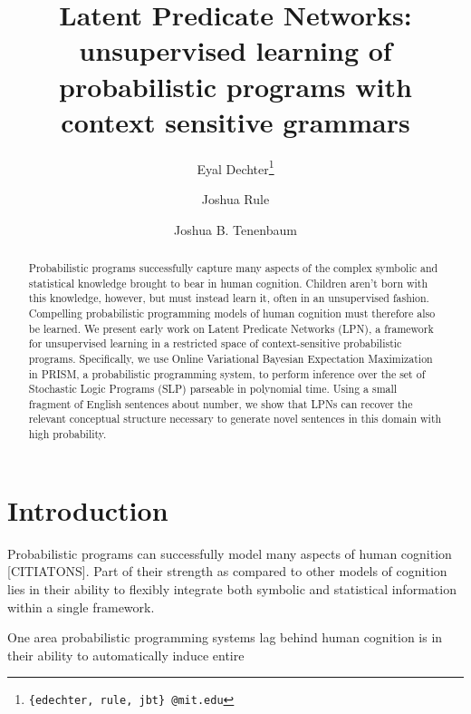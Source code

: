 \documentclass{article} %
\title{Latent Predicate Networks: unsupervised learning of  probabilistic programs with context sensitive grammars}
\author{Eyal Dechter\thanks{{\tt \{edechter, rule, jbt\} @mit.edu}}}
\author{Joshua Rule}
\author{Joshua B. Tenenbaum}
\affil{{\normalsize Department of Brain and Cognitive Sciences, MIT}}
\date{}
\begin{document}
\maketitle

\begin{abstract}

  Probabilistic programs successfully capture many aspects of the
  complex symbolic and statistical knowledge brought to bear in human
  cognition. Children aren't born with this knowledge, however, but
  must instead learn it, often in an unsupervised fashion. Compelling
  probabilistic programming models of human cognition must therefore
  also be learned. We present early work on Latent Predicate Networks
  (LPN), a framework for unsupervised learning in a restricted space
  of context-sensitive probabilistic programs. Specifically, we use
  Online Variational Bayesian Expectation Maximization in
  PRISM, a probabilistic programming system, to perform inference over
  the set of Stochastic Logic Programs (SLP) parseable in polynomial
  time. Using a small fragment of English sentences about number, we
  show that LPNs can recover the relevant conceptual structure
  necessary to generate novel sentences in this domain with high
  probability.
  
\end{abstract}

\section{Introduction}


Probabilistic programs can successfully model many aspects of human
cognition [CITIATONS]. Part of their strength as compared to other
models of cognition lies in their ability to flexibly integrate both
symbolic and statistical information within a single framework.

One area probabilistic programming systems lag behind human cognition
is in their ability to automatically induce entire 
\end{document}
